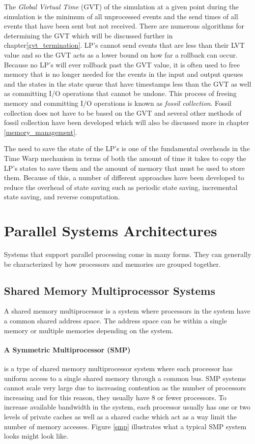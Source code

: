 \documentclass[11pt]{book}
\begin{document}
The \emph{Global Virtual Time} (GVT) of the simulation at a given point during the simulation
is the minimum of all unprocessed events and the send times of all events that have been
sent but not received\cite{jefferson-85}. There are numerous algorithms for determining
the GVT which will be discussed further in chapter\ref{gvt_termination}. LP's cannot send
events that are less than their LVT value and so the GVT acts as a lower bound on how far
a rollback can occur. Because no LP's will ever rollback past the GVT value, it is often
used to free memory that is no longer needed for the events in the input and output queues
and the states in the state queue that have timestamps less than the GVT as well as committing
I/O operations that cannot be undone. This process of freeing memory and committing I/O
operations is known as \emph{fossil collection}. Fossil collection does not have to be based
on the GVT and several other methods of fossil collection have been developed which will
also be discussed more in chapter \ref{memory_management}.

The need to save the state of the LP's is one of the fundamental overheads in the Time Warp
mechanism in terms of both the amount of time it takes to copy the LP's states to save them
and the amount of memory that must be used to store them. Because of this, a number of
different approaches have been developed to reduce the overhead of state saving such as
periodic state saving, incremental state saving, and reverse computation.

\section{Parallel Systems Architectures}

Systems that support parallel processing come in many forms. They can generally be
characterized by how processors and memories are grouped together. 

\subsection{Shared Memory Multiprocessor Systems}

A shared memory multiprocessor is a system where processors in the system have a common
shared address space. The address space can be within a single memory or multiple memories
depending on the system.

\paragraph{A Symmetric Multiprocessor (SMP)} is a type of shared memory multiprocessor
system where each processor has uniform access to a single shared memory through a common
bus. SMP systems cannot scale very large due to increasing contention as the number of
processors increasing and for this reason, they usually have 8 or fewer processors.
To increase available bandwidth in the system, each processor usually has one or two
levels of private caches as well as a shared cache which act as a way limit the number of
memory accesses. Figure \ref{smp} illustrates what a typical SMP system looks might look
like.
\end{document}
